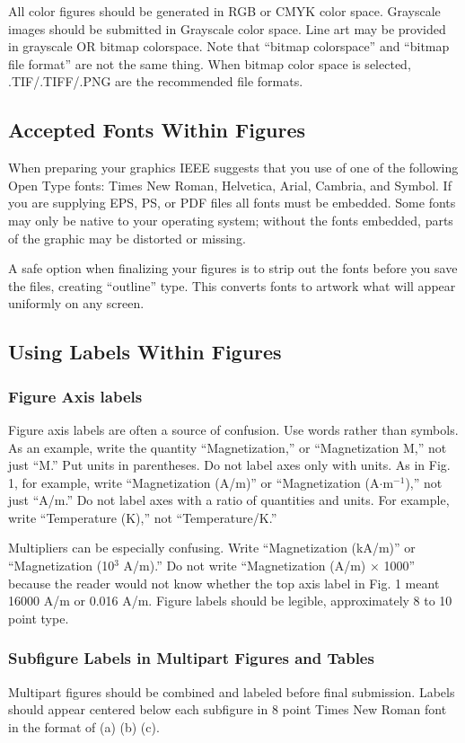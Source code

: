 \documentclass[journal,twoside,web]{ieeecolor}
\begin{document}
All color figures should be generated in RGB or CMYK color space. Grayscale 
images should be submitted in Grayscale color space. Line art may be 
provided in grayscale OR bitmap colorspace. Note that ``bitmap colorspace'' 
and ``bitmap file format'' are not the same thing. When bitmap color space 
is selected, .TIF/.TIFF/.PNG are the recommended file formats.

\subsection{Accepted Fonts Within Figures}
When preparing your graphics IEEE suggests that you use of one of the 
following Open Type fonts: Times New Roman, Helvetica, Arial, Cambria, and 
Symbol. If you are supplying EPS, PS, or PDF files all fonts must be 
embedded. Some fonts may only be native to your operating system; without 
the fonts embedded, parts of the graphic may be distorted or missing.

A safe option when finalizing your figures is to strip out the fonts before 
you save the files, creating ``outline'' type. This converts fonts to 
artwork what will appear uniformly on any screen.

\subsection{Using Labels Within Figures}

\subsubsection{Figure Axis labels }
Figure axis labels are often a source of confusion. Use words rather than 
symbols. As an example, write the quantity ``Magnetization,'' or 
``Magnetization M,'' not just ``M.'' Put units in parentheses. Do not label 
axes only with units. As in Fig. 1, for example, write ``Magnetization 
(A/m)'' or ``Magnetization (A$\cdot$m$^{-1}$),'' not just ``A/m.'' Do not label axes with a ratio of quantities and 
units. For example, write ``Temperature (K),'' not ``Temperature/K.'' 

Multipliers can be especially confusing. Write ``Magnetization (kA/m)'' or 
``Magnetization (10$^{3}$ A/m).'' Do not write ``Magnetization 
(A/m)$\,\times\,$1000'' because the reader would not know whether the top 
axis label in Fig. 1 meant 16000 A/m or 0.016 A/m. Figure labels should be 
legible, approximately 8 to 10 point type.

\subsubsection{Subfigure Labels in Multipart Figures and Tables}
Multipart figures should be combined and labeled before final submission. 
Labels should appear centered below each subfigure in 8 point Times New 
Roman font in the format of (a) (b) (c). 
\end{document}
